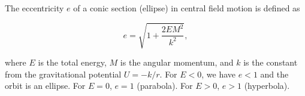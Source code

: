 The eccentricity $e$ of a conic section (ellipse) in central field motion is defined as

$$e = \sqrt{1 + \frac{2EM^2}{k^2}},$$

where $E$ is the total energy, $M$ is the angular momentum, and $k$ is the constant from the gravitational potential $U = -k/r$. For $E < 0$, we have $e < 1$ and the orbit is an ellipse. For $E = 0$, $e = 1$ (parabola). For $E > 0$, $e > 1$ (hyperbola).
